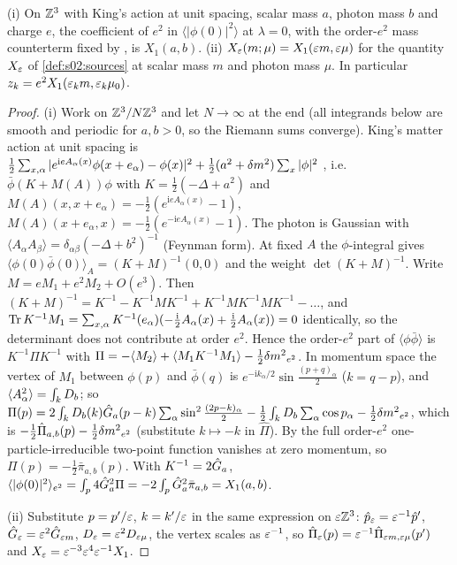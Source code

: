\begin{lemma}\label{lem:a05:deriv}
\textup{(i)} On $\mathbb Z^3$ with King's action at unit spacing, scalar mass $a$, photon mass $b$ and charge $e$, the coefficient of $e^2$ in $\langle|\phi(0)|^2\rangle$ at $\lambda=0$, with the order-$e^2$ mass counterterm fixed by \cite[(3.33)]{K1}, is $X_1(a,b)$. \textup{(ii)} $X_{\varepsilon}(m;\mu)=X_1(\varepsilon m,\varepsilon\mu)$ for the quantity $X_{\varepsilon}$ of \cref{def:s02:sources} at scalar mass $m$ and photon mass $\mu$. In particular $z_k=e^2X_1(\varepsilon_km,\varepsilon_k\mu_0)$.
\end{lemma}
\begin{proof}
(i) Work on $\mathbb Z^3/N\mathbb Z^3$ and let $N\to\infty$ at the end (all integrands below are smooth and periodic for $a,b>0$, so the Riemann sums converge). King's matter action at unit spacing is $\frac12\sum_{x,\alpha}|e^{\mathrm ieA_\alpha(x)}\phi(x+e_\alpha)-\phi(x)|^2+\frac12(a^2+{\delta m^2})\sum_x|\phi|^2$ \cite[(2.3), (2.5)]{K2}, i.e.\ $\bar\phi(K+M(A))\phi$ with $K=\frac12(-\Delta+a^2)$ and $M(A)(x,x+e_\alpha)=-\frac12(e^{\mathrm ieA_\alpha(x)}-1)$, $M(A)(x+e_\alpha,x)=-\frac12(e^{-\mathrm ieA_\alpha(x)}-1)$. The photon is Gaussian with $\langle A_\alpha A_\beta\rangle=\delta_{\alpha\beta}(-\Delta+b^2)^{-1}$ (Feynman form). At fixed $A$ the $\phi$-integral gives $\langle\phi(0)\bar\phi(0)\rangle_A=(K+M)^{-1}(0,0)$ and the weight $\det(K+M)^{-1}$. Write $M=eM_1+e^2M_2+O(e^3)$. Then $(K+M)^{-1}=K^{-1}-K^{-1}MK^{-1}+K^{-1}MK^{-1}MK^{-1}-\dots$, and $\operatorname{Tr} K^{-1}M_1=\sum_{x,\alpha}K^{-1}(e_\alpha)(-\frac{\mathrm i}2A_\alpha(x)+\frac{\mathrm i}2A_\alpha(x))=0$ identically, so the determinant does not contribute at order $e^2$. Hence the order-$e^2$ part of $\langle\phi\bar\phi\rangle$ is $K^{-1}\Pi K^{-1}$ with $\Pi=-\langle M_2\rangle+\langle M_1K^{-1}M_1\rangle-\frac12{\delta m^2}_{e^2}$. In momentum space the vertex of $M_1$ between $\phi(p)$ and $\bar\phi(q)$ is $e^{-\mathrm ik_\alpha/2}\sin\frac{(p+q)_\alpha}2$ ($k=q-p$), and $\langle A_\alpha^2\rangle=\int_{k} D_b$; so $\Pi(p)=2\int_{k} D_b(k)\hat G_a(p-k)\sum_\alpha\sin^2\frac{(2p-k)_\alpha}2-\frac12\int_{k} D_b\sum_\alpha\cos p_\alpha-\frac12{\delta m^2}_{e^2}$, which is $-\frac12\hat\Pi_{a,b}(p)-\frac12{\delta m^2}_{e^2}$ (substitute $k\mapsto-k$ in $\hat\Pi$). By \cite[(3.33)]{K1} the full order-$e^2$ one-particle-irreducible two-point function vanishes at zero momentum, so $\Pi(p)=-\frac12\bar\pi_{a,b}(p)$. With $K^{-1}=2\hat G_a$, $\langle|\phi(0)|^2\rangle_{e^2}=\int_{p}4\hat G_a^2\Pi=-2\int_{p}\hat G_a^2\bar\pi_{a,b}=X_1(a,b)$.

(ii) Substitute $p=p'/\varepsilon$, $k=k'/\varepsilon$ in the same expression on $\varepsilon\mathbb Z^3$: $\hat p_{\varepsilon}=\varepsilon^{-1}\hat p'$, $\hat G_{\varepsilon}=\varepsilon^2\hat G_{\varepsilon m}$, $D_{\varepsilon}=\varepsilon^2D_{\varepsilon\mu}$, the vertex scales as $\varepsilon^{-1}$, so $\hat\Pi_{\varepsilon}(p)=\varepsilon^{-1}\hat\Pi_{\varepsilon m,\varepsilon\mu}(p')$ and $X_{\varepsilon}=\varepsilon^{-3}\varepsilon^4\varepsilon^{-1}X_1$.
\end{proof}

